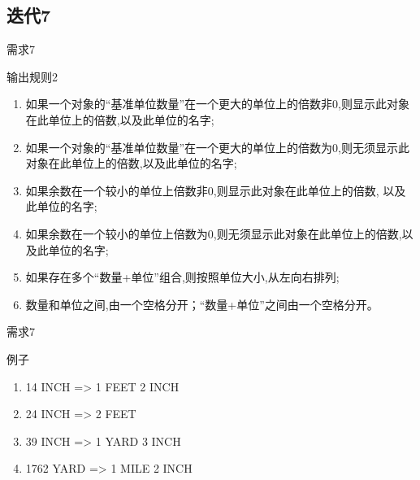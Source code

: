 \subsection{迭代7}

\begin{frame}{需求7}
  \begin{block}{输出规则2}
    \begin{enumerate}
      \item 如果一个对象的“基准单位数量”在一个更大的单位上的倍数非0,则显示此对象在此单位上的倍数,以及此单位的名字;
      \item 如果一个对象的“基准单位数量”在一个更大的单位上的倍数为0,则无须显示此对象在此单位上的倍数,以及此单位的名字;
      \item 如果余数在一个较小的单位上倍数非0,则显示此对象在此单位上的倍数, 以及此单位的名字;
      \item 如果余数在一个较小的单位上倍数为0,则无须显示此对象在此单位上的倍数,以及此单位的名字;
      \item 如果存在多个“数量+单位”组合,则按照单位大小,从左向右排列;
      \item 数量和单位之间,由一个空格分开；“数量+单位”之间由一个空格分开。
    \end{enumerate}
  \end{block}
\end{frame}

\begin{frame}{需求7}
  \begin{block}{例子}
    \begin{enumerate}
      \item 14 INCH => 1 FEET 2 INCH
      \item 24 INCH => 2 FEET
      \item 39 INCH => 1 YARD 3 INCH
      \item 1762 YARD => 1 MILE 2 INCH
    \end{enumerate}
  \end{block}
\end{frame}

